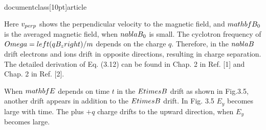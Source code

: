 \\documentclass[10pt]{article}
\begin{document}
Here $v_{\\perp}$ shows the perpendicular velocity to the magnetic field, and $\\mathbf{B}_{0}$ is the averaged magnetic field, when $\\nabla B_{0}$ is small. The cyclotron frequency of $\\Omega=\\left(q B_{z}\\right) / m$ depends on the charge $q$. Therefore, in the $\\nabla B$ drift electrons and ions drift in opposite directions, resulting in charge separation. The detailed derivation of Eq. (3.12) can be found in Chap. 2 in Ref. [1] and Chap. 2 in Ref. [2].

When $\\mathbf{E}$ depends on time $t$ in the $E \\times B$ drift as shown in Fig.3.5, another drift appears in addition to the $E \\times B$ drift. In Fig. 3.5 $E_{y}$ becomes large with time. The plus $+q$ charge drifts to the upward direction, when $E_{y}$ becomes large.
\end{document}
